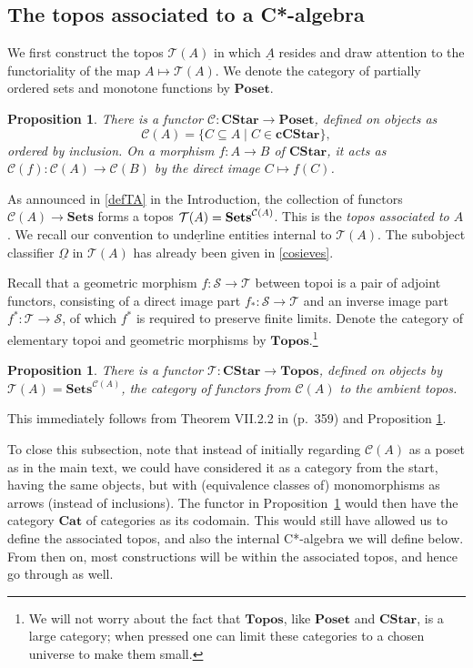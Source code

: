 \documentclass[12pt]{article}
\newcommand{\Sets}{\mbox{\textbf{Sets}}}
\newcommand{\er}{\eqref}
\newcommand{\CA}{{\mathcal A}} \newcommand{\CB}{{\mathcal B}}
\newcommand{\alg}[1]{\ensuremath{#1}}
\newcommand{\functor}[1]{\ensuremath{\underline{#1}}}
\newcommand{\Cat}[1]{\ensuremath{\mathrm{\textbf{#1}}}}
\newcommand{\Cstar}{\Cat{CStar}\xspace}
\newcommand{\Ccstar}{\Cat{cCStar}\xspace}
\newcommand{\Set}{\Cat{Sets}\xspace}
\newcommand{\context}{\ensuremath{\mathcal{C}}}
\newcommand{\asstopos}{\ensuremath{\mathcal{T}}}
\newcommand{\uA}{\underline{A}}
\renewcommand{\CA}{\mathcal{C}(A)}
\newcommand{\TA}{\mathcal{T}(A)}
\renewcommand{\TA}{\asstopos(\alg{A})}
\renewcommand{\CA}{\context(\alg{A})}
\newtheorem{proposition}[theorem]{Proposition}
\begin{document}
\subsection{The topos associated to a C*-algebra}
We first construct the topos $\TA$ in which $\uA$ resides and draw attention to
the functoriality of the map $A\mapsto \TA$.
We denote the category of partially ordered sets and monotone
functions  by $\Cat{Poset}$.

\begin{proposition}
\label{prop:contextfunctor}
  There is a functor $\context : \Cstar \to \Cat{Poset}$,  defined
  on objects as
  \[
    \CA = \{ \alg{C} \subseteq \alg{A} \mid
                           \alg{C} \in \Ccstar \},
  \]
  ordered by inclusion.
  On a morphism $f:\alg{A} \to \alg{B}$ of \Cstar,
  it acts as $\mathcal{C}(f) : \CA \to
  \mathcal{C}(\alg{B})$ by the direct image $\alg{C} \mapsto f(\alg{C})$.
\end{proposition}
As announced in \er{defTA} in the Introduction, the collection of
functors  $\CA \to \Set$ forms a topos
$\asstopos(\alg{A})=\Sets^{\CA}$. This is the \emph{topos associated
to $A$}. We recall our convention to  $\underline{\mathrm{underline}}$
entities internal to $\TA$. The subobject classifier $\functor{\Omega}$ in
$\asstopos(\alg{A})$ has already been given in \er{cosieves}.

Recall that a geometric morphism $f:\mathcal{S} \to \mathcal{T}$ between
topoi is a pair of adjoint functors, consisting of a direct image
part $f_*:\mathcal{S}\to\mathcal{T}$ and an inverse image part $f^*:\mathcal{T}
\to \mathcal{S}$, of which $f^*$ is required to preserve finite limits.
Denote the category of elementary topoi and geometric
morphisms  by \Cat{Topos}.\footnote{We will not worry about the fact that
\Cat{Topos}, like \Cat{Poset} and \Cstar, is a large category;
when pressed one can limit these categories to a chosen universe to
make them small.}
\begin{proposition}
\label{prop:asstopos}
  There is a functor $\asstopos : \Cstar \to \Cat{Topos}$, defined
  on objects by $\asstopos(\alg{A})=\Set^{\CA}$, the
  category of functors from $\CA$ to the ambient topos.
\end{proposition}
This immediately follows from Theorem VII.2.2 in
\cite{maclanemoerdijk92} (p.\ 359) and Proposition
\ref{prop:contextfunctor}.

To close this subsection, note that instead of
initially regarding $\CA$ as a
 poset as in the main text, we could have considered it as a category from the
start, having the same
objects, but with (equivalence classes of) monomorphisms as arrows (instead of
inclusions). The functor in
Proposition~\ref{prop:contextfunctor} would then have the category
$\Cat{Cat}$ of categories as its codomain. This would still have
allowed us to define the associated topos, and also the internal
C*-algebra we will define below. From then on, most
constructions will be within the associated topos, and hence go
through as well.
\end{document}
